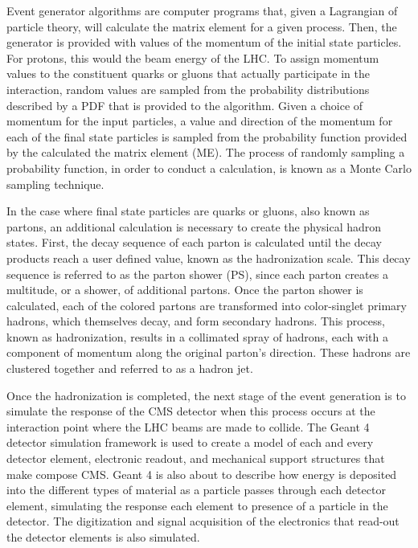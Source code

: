 \par Event generator algorithms are computer programs
that, given a Lagrangian of particle theory, will calculate the
matrix element for a given process.  Then, the generator is provided
with values of the momentum of the initial state particles.  For
protons, this would the beam energy of the LHC.  To assign momentum
values to the constituent quarks or gluons that actually participate
in the interaction, random values are sampled from the probability
distributions described by a PDF that is provided to the algorithm.
Given a choice of momentum for the input particles, a value and
direction of the momentum for each of the final state particles is
sampled from the probability function provided by the calculated the
matrix element (ME).  The process of randomly sampling a probability
function, in order to conduct a calculation, is known as a Monte Carlo
sampling technique.    

\par In the case where final state particles are quarks or gluons,
also known as partons, an additional calculation is necessary to
create the physical hadron states.  First, the decay sequence of each
parton is calculated until the decay products reach a user defined
value, known as the hadronization scale.  This decay sequence is
referred to as the parton shower (PS), since each parton creates a
multitude, or a shower, of additional partons.  Once the parton shower
is calculated, each of the colored partons are transformed into
color-singlet primary hadrons, which themselves decay, and form
secondary hadrons.  This process, known as hadronization, results in a
collimated spray of hadrons, each with a component of momentum along
the original parton's direction.  These hadrons are clustered together
and referred to as a hadron jet.   

\par Once the hadronization is completed, the next stage of the event
generation is to simulate the response of the CMS detector when this
process occurs at the interaction point where the LHC beams are made
to collide.  The Geant 4 detector simulation framework is used to
create a model of each and every detector element, electronic readout,
and mechanical support structures that make compose CMS.  Geant 4 is
also about to describe how energy is deposited into the different
types of material as a particle passes through each detector element,
simulating the response each element to presence of a particle in the
detector.  The digitization and signal acquisition of the electronics
that read-out the detector elements is also simulated.  


